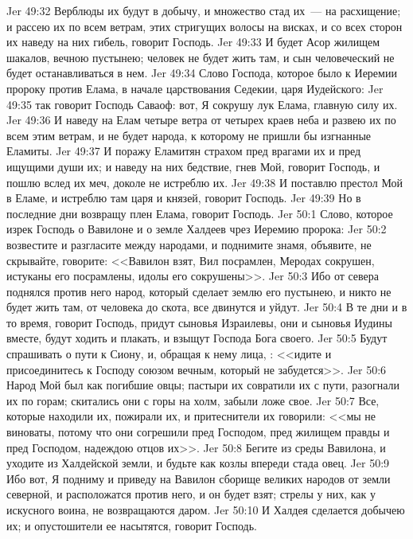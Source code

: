\vs Jer 49:32 Верблюды их  будут в добычу, и множество стад их~--- на расхищение; и рассею их по всем ветрам, этих стригущих волосы на висках, и со всех сторон их наведу на них гибель, говорит Господь.
\vs Jer 49:33 И будет Асор жилищем шакалов, вечною пустынею; человек не будет жить там, и сын человеческий не будет останавливаться в нем.
\rsbpar\vs Jer 49:34 Слово Господа, которое было к Иеремии пророку против Елама, в начале царствования Седекии, царя Иудейского:
\vs Jer 49:35 так говорит Господь Саваоф: вот, Я сокрушу лук Елама, главную силу их.
\vs Jer 49:36 И наведу на Елам четыре ветра от четырех краев неба и развею их по всем этим ветрам, и не будет народа, к которому не пришли бы изгнанные Еламиты.
\vs Jer 49:37 И поражу Еламитян страхом пред врагами их и пред ищущими души их; и наведу на них бедствие, гнев Мой, говорит Господь, и пошлю вслед их меч, доколе не истреблю их.
\vs Jer 49:38 И поставлю престол Мой в Еламе, и истреблю там царя и князей, говорит Господь.
\vs Jer 49:39 Но в последние дни возвращу плен Елама, говорит Господь.
\vs Jer 50:1 Слово, которое изрек Господь о Вавилоне и о земле Халдеев чрез Иеремию пророка:
\vs Jer 50:2 возвестите и разгласите между народами, и поднимите знамя, объявите, не скрывайте, говорите: <<Вавилон взят, Вил посрамлен, Меродах сокрушен, истуканы его посрамлены, идолы его сокрушены>>.
\vs Jer 50:3 Ибо от севера поднялся против него народ, который сделает землю его пустынею, и никто не будет жить там, от человека до скота, все двинутся и уйдут.
\vs Jer 50:4 В те дни и в то время, говорит Господь, придут сыновья Израилевы, они и сыновья Иудины вместе, будут ходить и плакать, и взыщут Господа Бога своего.
\vs Jer 50:5 Будут спрашивать о пути к Сиону, и, обращая к нему лица, : <<идите и присоединитесь к Господу союзом вечным, который не забудется>>.
\vs Jer 50:6 Народ Мой был как погибшие овцы; пастыри их совратили их с пути, разогнали их по горам; скитались они с горы на холм, забыли ложе свое.
\vs Jer 50:7 Все, которые находили их, пожирали их, и притеснители их говорили: <<мы не виноваты, потому что они согрешили пред Господом, пред жилищем правды и пред Господом, надеждою отцов их>>.
\vs Jer 50:8 Бегите из среды Вавилона, и уходите из Халдейской земли, и будьте как козлы впереди стада овец.
\vs Jer 50:9 Ибо вот, Я подниму и приведу на Вавилон сборище великих народов от земли северной, и расположатся против него, и он будет взят; стрелы у них, как у искусного воина, не возвращаются даром.
\vs Jer 50:10 И Халдея сделается добычею их; и опустошители ее насытятся, говорит Господь.
